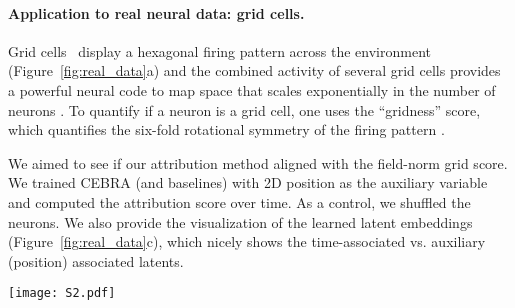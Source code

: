 \paragraph{Application to real neural data: grid cells.}

Grid cells~\citep{hafting2005microstructure} display a hexagonal firing pattern across the environment (Figure~\ref{fig:real_data}a) and the combined activity of several grid cells provides a powerful neural code to map space that scales exponentially in the number of neurons \citep{fiete2008grid,mathis2012resolution}. 
To quantify if a neuron is a grid cell, one uses the ``gridness'' score, which quantifies the six-fold rotational symmetry of the firing pattern 
\citep{sargolini2006conjunctive, brandon2011reduction}.

We aimed to see if our attribution method aligned with the field-norm grid score. We trained CEBRA (and baselines) with 2D position as the auxiliary variable and computed the attribution score over time. As a control, we shuffled the neurons.
%
We also provide the visualization of the learned latent embeddings (Figure~\ref{fig:real_data}c), which nicely shows the time-associated vs. auxiliary (position) associated latents.


\begin{figure*}[th]
    \centering
    \texttt{[image: S2.pdf]}
    \caption{\textbf{Real Neural data and behavior \citep{Gardner2022}}.
        (a) spiking of 128 grid cells with example ratemaps.
        (b) Bottom: behavioral trajectory over the 2D arena, and speed
            and heading of the rat. Red line in each panel denotes the
            same time step. 
        (c) Visualization of a converged embedding on the real grid cell dataset. The embedding space is jointly trained with behavioral information about animal position (first 4 dimensions, top) and additional time-varying latent information (the remaining 10 dimensions) with our regularized contrastive learning hybrid contrastive learning setting (CEBRA). The position information was decoded as indicated by cross-validated R2 score on held-out data. Training embedding is shown.
        (d) Attribution map across time \& Position Attribution vs. Grid Score. Scores are centered and standardized. Grid score vs. attribution score shows separation of the cell types.
    }
    \label{fig:real_data}
\end{figure*}


